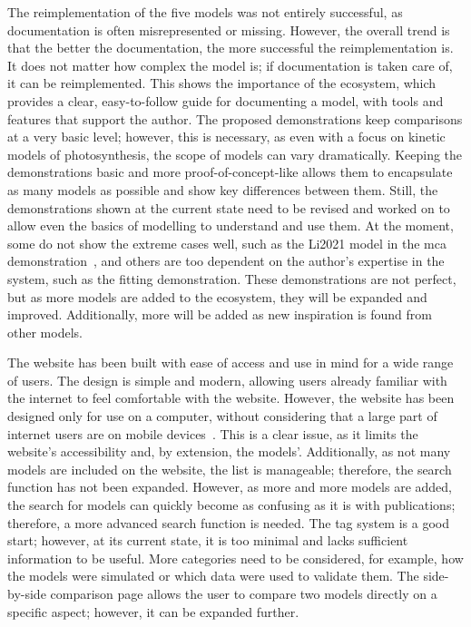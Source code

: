 The reimplementation of the five models was not entirely successful, as documentation is often misrepresented or missing. However, the overall trend is that the better the documentation, the more successful the reimplementation is. It does not matter how complex the model is; if documentation is taken care of, it can be reimplemented. This shows the importance of the \greensloth{} ecosystem, which provides a clear, easy-to-follow guide for documenting a model, with tools and features that support the author. The proposed demonstrations keep comparisons at a very basic level; however, this is necessary, as even with a focus on kinetic models of photosynthesis, the scope of models can vary dramatically. Keeping the demonstrations basic and more proof-of-concept-like allows them to encapsulate as many models as possible and show key differences between them. Still, the demonstrations shown at the current state need to be revised and worked on to allow even the basics of modelling to understand and use them. At the moment, some do not show the extreme cases well, such as the Li2021 model in the \gls{mca} demonstration~, and others are too dependent on the author's expertise in the system, such as the fitting demonstration. These demonstrations are not perfect, but as more models are added to the \greensloth{} ecosystem, they will be expanded and improved. Additionally, more will be added as new inspiration is found from other models.

The website has been built with ease of access and use in mind for a wide range of users. The design is simple and modern, allowing users already familiar with the internet to feel comfortable with the website. However, the website has been designed only for use on a computer, without considering that a large part of internet users are on mobile devices~\cite{Digital2025Global2025}. This is a clear issue, as it limits the website's accessibility and, by extension, the models'. Additionally, as not many models are included on the website, the list is manageable; therefore, the search function has not been expanded. However, as more and more models are added, the search for models can quickly become as confusing as it is with publications; therefore, a more advanced search function is needed. The tag system is a good start; however, at its current state, it is too minimal and lacks sufficient information to be useful. More categories need to be considered, for example, how the models were simulated or which data were used to validate them. The side-by-side comparison page allows the user to compare two models directly on a specific aspect; however, it can be expanded further.

